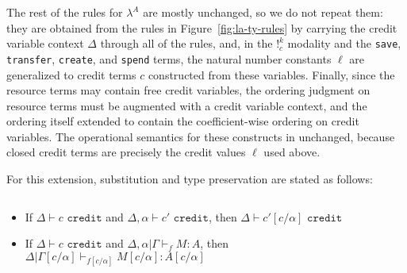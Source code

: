 


The rest of the rules for $\lambda^A$ are mostly unchanged, so we do not repeat them: they are obtained from the rules in Figure~\ref{fig:la-ty-rules} by carrying the credit variable context $\Delta$ through all of the rules, and,
in the $!^k_c$ modality and the \texttt{save}, \texttt{transfer},
\texttt{create}, and \texttt{spend} terms, the natural number constants
$\ell$ are generalized to credit terms $c$ constructed from these variables.
Finally, since the resource terms may contain free credit variables, the ordering judgment on resource terms must be augmented with a credit variable context, and the ordering itself extended to contain the coefficient-wise ordering on credit variables.
The operational semantics for these constructs in unchanged, because closed credit terms are
precisely the credit values $\ell$ used above.

For this extension, substitution and type preservation are stated as follows:

\begin{theorem}[Substitution]\label{thm:subst-ext}
$\;$
\begin{itemize}
  \item If $\Delta \vdash c \texttt{ credit}$ and $\Delta,\alpha \vdash c' \texttt{ credit}$, then $\Delta \vdash c'[c/\alpha] \texttt{ credit}$
  \item If $\Delta \vdash c \texttt{ credit}$ and $\Delta,\alpha|\Gamma\vdash_f M : A$, then $\Delta|\Gamma[c/\alpha] \vdash_{f[c/\alpha]} M[c/\alpha] : A[c/\alpha]$
\end{itemize}
\end{theorem}

